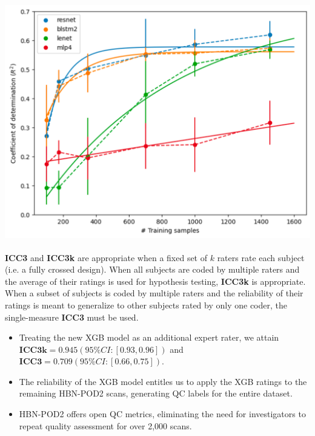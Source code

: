 \documentclass[a0paper,landscape,fontscale=0.395]{baposter}
\newenvironment{Figure}
  {\par\medskip\noindent\minipage{\linewidth}}
  {\endminipage\par\medskip}
\begin{document}
\begin{poster}
{\begin{multicols}{3}
    \columnbreak
    \begin{Figure}
        \centering
        \includegraphics[width=0.33\linewidth]{figures/results_high_aug.pdf}
    \end{Figure}

    \vspace{2em}
    {\smaller %
        \textsuperscript{\textasteriskcentered} \textbf{ICC3} and \textbf{ICC3k}
        are appropriate when a fixed set of $k$ raters rate each subject (i.e. a
        fully crossed design).  When all subjects are coded by multiple raters
        and the average of their ratings is used for hypothesis testing,
        \textbf{ICC3k} is appropriate.  When a subset of subjects is coded by
        multiple raters and the reliability of their ratings is meant to
        generalize to other subjects rated by only one coder, the single-measure
        \textbf{ICC3} must be used.
    }
\end{multicols}

\begin{itemize}[noitemsep, leftmargin=*]
    \item Treating the new XGB model as an additional expert rater, we attain
    $\textbf{ICC3k} = 0.945 (95\% CI: [0.93, 0.96])$ and
    $\textbf{ICC3} = 0.709 (95\% CI: [0.66, 0.75])$.
    \item The reliability of the XGB model entitles us to apply the XGB ratings
    to the remaining HBN-POD2 scans, generating QC labels for the entire
    dataset.
    \item HBN-POD2 offers open QC metrics, eliminating the need for
    investigators to repeat quality assessment for over 2,000 scans.
\end{itemize}
}


\end{poster}
\end{document}

